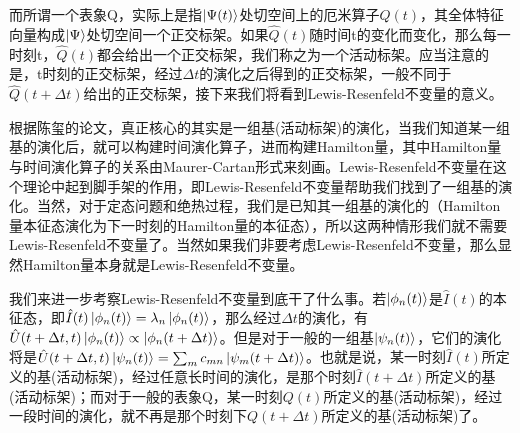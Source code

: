\documentclass[a4paper]{article}
\begin{document}
        而所谓一个表象Q，实际上是指$\ket{\Psi(t)}$处切空间上的厄米算子$\hat{Q}(t)$，其全体特征向量构成$\ket{\Psi}$处切空间一个正交标架。如果$\hat{Q}(t)$随时间t的变化而变化，那么每一时刻t，$\hat{Q}(t)$都会给出一个正交标架，我们称之为一个活动标架。应当注意的是，t时刻的正交标架，经过$\Delta t$的演化之后得到的正交标架，一般不同于$\hat{Q}(t+\Delta t)$给出的正交标架，接下来我们将看到Lewis-Resenfeld不变量的意义。

        根据陈玺的论文，真正核心的其实是一组基(活动标架)的演化，当我们知道某一组基的演化后，就可以构建时间演化算子，进而构建Hamilton量，其中Hamilton量与时间演化算子的关系由Maurer-Cartan形式来刻画。Lewis-Resenfeld不变量在这个理论中起到脚手架的作用，即Lewis-Resenfeld不变量帮助我们找到了一组基的演化。当然，对于定态问题和绝热过程，我们是已知其一组基的演化的（Hamilton量本征态演化为下一时刻的Hamilton量的本征态），所以这两种情形我们就不需要Lewis-Resenfeld不变量了。当然如果我们非要考虑Lewis-Resenfeld不变量，那么显然Hamilton量本身就是Lewis-Resenfeld不变量。

        我们来进一步考察Lewis-Resenfeld不变量到底干了什么事。若$\ket{\phi_n(t)}$是$\hat{I}(t)$的本征态，即$\hat{I}(t)\ket{\phi_n(t)}=\lambda_n\ket{\phi_n(t)}$，那么经过$\Delta t$的演化，有$\hat{U}(t+\Delta t, t)\ket{\phi_n(t)}\propto\ket{\phi_n(t+\Delta t)}$。但是对于一般的一组基$\ket{\psi_n(t)}$，它们的演化将是$\hat{U}(t+\Delta t, t)\ket{\psi_n(t)}=\sum_m c_{mn}\ket{\psi_m(t+\Delta t)}$。也就是说，某一时刻$\hat{I}(t)$所定义的基(活动标架)，经过任意长时间的演化，是那个时刻$\hat{I}(t+\Delta t)$所定义的基(活动标架)；而对于一般的表象Q，某一时刻$Q(t)$所定义的基(活动标架)，经过一段时间的演化，就不再是那个时刻下$Q(t+\Delta t)$所定义的基(活动标架)了。
\end{document}
